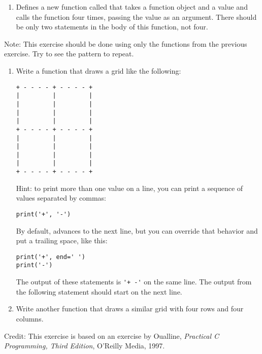 \begin{exercise}
\begin{enumerate}
\item Defines a new function called  that takes a function object and a value and calls the function four times, passing the value as an argument. There should be only two statements in the body of this function, not four.

\end{enumerate}


\end{exercise}


\begin{exercise}

Note: This exercise should be done using only the functions from the previous exercise. Try to see the pattern to repeat.

\begin{enumerate}
\item Write a function that draws a grid like the following:

\begin{Verbatim}
+ - - - - + - - - - +
|         |         |
|         |         |
|         |         |
|         |         |
+ - - - - + - - - - +
|         |         |
|         |         |
|         |         |
|         |         |
+ - - - - + - - - - +
\end{Verbatim}
%
Hint: to print more than one value on a line, you can print a sequence of values separated by commas:

\begin{Verbatim}
print('+', '-')
\end{Verbatim}
%
By default,  advances to the next line, but you can override that behavior and put a trailing space, like this:

\begin{Verbatim}
print('+', end=' ')
print('-')
\end{Verbatim}
%
The output of these statements is \verb"'+ -'" on the same line. The output from the following  statement should start on the next line.


\item Write another function that draws a similar grid with four rows and four columns.
\end{enumerate}

Credit: This exercise is based on an exercise by Oualline, {\em Practical C Programming, Third Edition}, O'Reilly Media, 1997.

\end{exercise}